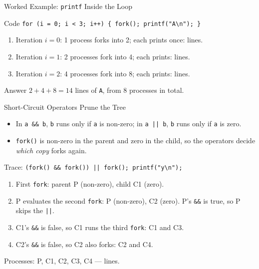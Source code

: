 \documentclass[aspectratio=169]{beamer}
\begin{document}
\begin{frame}{Worked Example: \texttt{printf} Inside the Loop}
  \begin{block}{Code}
    \texttt{for (i = 0; i < 3; i++) \{ fork(); printf("A\textbackslash n"); \}}
  \end{block}
  \begin{enumerate}
    \item Iteration $i=0$: 1 process forks into 2; each prints once: 
      lines.
    \item Iteration $i=1$: 2 processes fork into 4; each prints: 
      lines.
    \item Iteration $i=2$: 4 processes fork into 8; each prints: 
      lines.
  \end{enumerate}
  \vspace{0.1cm}
  \begin{exampleblock}{Answer}
    $2 + 4 + 8 = 14$ lines of \texttt{A}, from $8$ processes in total.
  \end{exampleblock}
\end{frame}

\begin{frame}{Short-Circuit Operators Prune the Tree}
  \begin{itemize}
    \item In \texttt{a \&\& b}, \texttt{b} runs only if \texttt{a} is
      non-zero; in \texttt{a || b}, \texttt{b} runs only if \texttt{a} is
      zero.
    \item \texttt{fork()} is non-zero in the parent and zero in the child, so
      the operators decide \emph{which copy} forks again.
  \end{itemize}
  \begin{exampleblock}{Trace: \texttt{(fork() \&\& fork()) || fork(); printf("y\textbackslash n");}}
    \begin{enumerate}
      \item First \texttt{fork}: parent P (non-zero), child C1 (zero).
      \item P evaluates the second \texttt{fork}: P (non-zero), C2 (zero). P's
        \texttt{\&\&} is true, so P skips the \texttt{||}.
      \item C1's \texttt{\&\&} is false, so C1 runs the third \texttt{fork}:
        C1 and C3.
      \item C2's \texttt{\&\&} is false, so C2 also forks: C2 and C4.
    \end{enumerate}
    Processes: P, C1, C2, C3, C4 ---  lines. 
  \end{exampleblock}
\end{frame}
\end{document}
